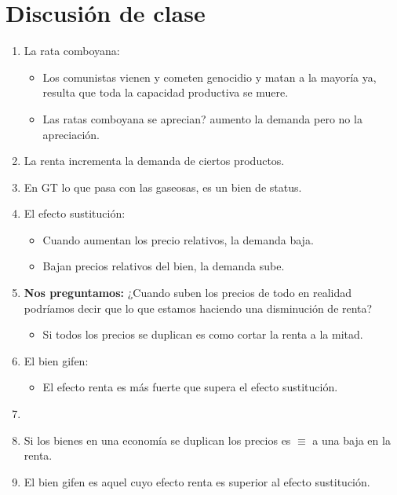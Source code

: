 \section{Discusión de clase}
\begin{enumerate}
    \item La rata comboyana:
        \begin{itemize}
            \item Los comunistas vienen y cometen genocidio y matan a la mayoría ya, resulta que toda la capacidad productiva se muere.
            \item Las ratas comboyana se aprecian? aumento la demanda pero no la apreciación. 
        \end{itemize}
    
    \item La renta incrementa la demanda de ciertos productos.
    \item En GT lo que pasa con las gaseosas, es un bien de status.
    \item El efecto sustitución:
        \begin{itemize}
            \item Cuando aumentan los precio relativos, la demanda baja.
            \item Bajan precios relativos del bien, la demanda sube.
        \end{itemize}
    
    \item \textbf{Nos preguntamos:} ¿Cuando suben los precios de todo en realidad podríamos decir que lo que estamos haciendo una disminución de renta?
        \begin{itemize}
            \item Si todos los precios se duplican es como cortar la renta a la mitad.
        \end{itemize}
    
    \item El bien gifen:
        \begin{itemize}
            \item El efecto renta es más fuerte que supera el efecto sustitución.
        \end{itemize}
    
    \item \begin{figure}[htbp]
        \centering
        \caption{}
        \label{}
    \end{figure}
    
    \item Si los bienes en una economía se duplican los precios es $\equiv$ a una baja en la renta.
    \item El bien gifen es aquel cuyo efecto renta es superior al efecto sustitución.  
\end{enumerate}

